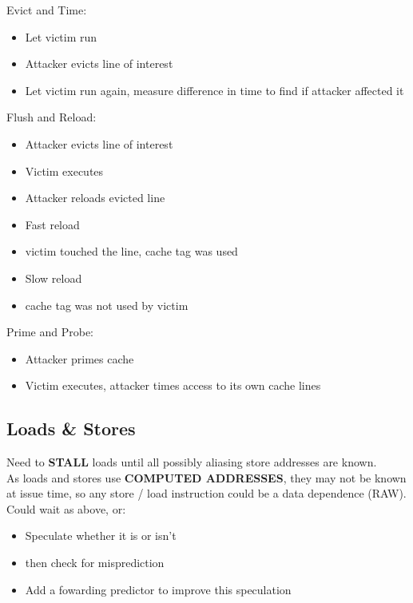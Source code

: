 \documentclass[a4paper, 5pt, twocolumn]{article}
\begin{document}
Evict and Time: 
\begin{itemize}[topsep=0pt,itemsep=-1ex,partopsep=1ex,parsep=1ex]
	\item Let victim run 
	\item Attacker evicts line of interest  
	\item Let victim run again, measure difference in time to find if attacker affected it \\
\end{itemize}
Flush and Reload:
\begin{itemize}[topsep=0pt,itemsep=-1ex,partopsep=1ex,parsep=1ex]
 \item Attacker evicts line of interest 
 \item Victim executes 
 \item Attacker reloads evicted line 
 \item Fast reload  
 \item victim touched the line, cache tag was used 
 \item Slow reload 
 \item cache tag was not used by victim\\
\end{itemize}
Prime and Probe:
\begin{itemize}[topsep=0pt,itemsep=-1ex,partopsep=1ex,parsep=1ex]
 \item Attacker primes cache 
 \item Victim executes, attacker times access to its own cache lines \\
\end{itemize}
\hypertarget{loads-stores}{%
\subsection{Loads \& Stores}\label{loads-stores}}

Need to \textbf{STALL} loads until all possibly aliasing store addresses
are known. \\

As loads and stores use \textbf{COMPUTED ADDRESSES}, they may not be
known at issue time, so any store / load instruction could be a data
dependence (RAW). Could wait as above, or:
\begin{itemize}[topsep=0pt,itemsep=-1ex,partopsep=1ex,parsep=1ex]
 \item Speculate whether it is or isn't 
 \item then check for misprediction 
 \item Add a fowarding predictor to improve this speculation \\
\end{itemize}
\end{document}
